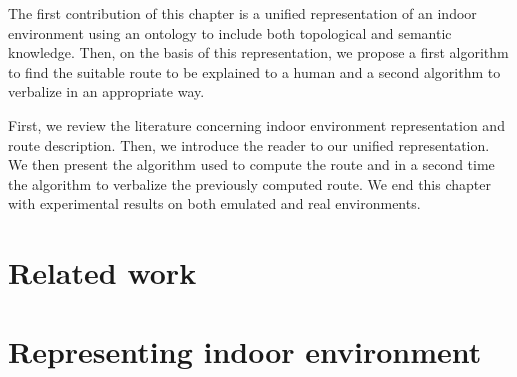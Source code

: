The first contribution of this chapter is a unified representation of an indoor environment using an ontology to include both topological and semantic knowledge. Then, on the basis of this representation, we propose a first algorithm to find the suitable route to be explained to a human and a second algorithm to verbalize in an appropriate way.

First, we review the literature concerning indoor environment representation and route description. Then, we introduce the reader to our unified representation. We then present the algorithm used to compute the route and in a second time the algorithm to verbalize the previously computed route. We end this chapter with experimental results on both emulated and real environments.

\section{Related work}

\section{Representing indoor environment}



